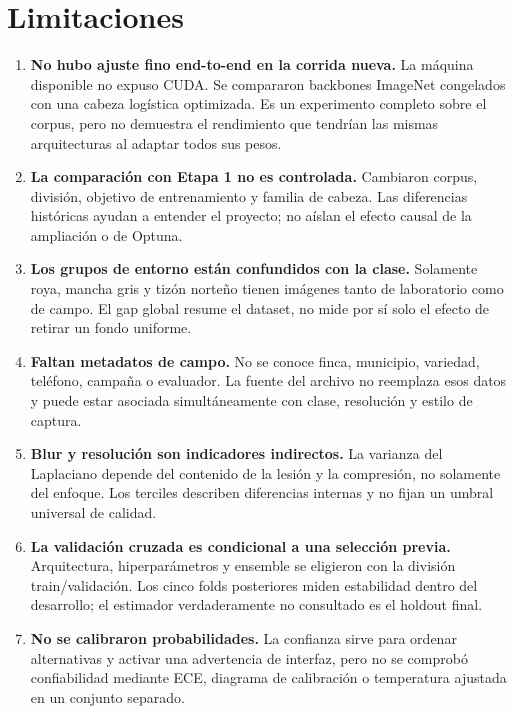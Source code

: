 \section{Limitaciones}

\begin{enumerate}
  \item \textbf{No hubo ajuste fino end-to-end en la corrida nueva.} La máquina
  disponible no expuso CUDA. Se compararon backbones ImageNet congelados con
  una cabeza logística optimizada. Es un experimento completo sobre el corpus,
  pero no demuestra el rendimiento que tendrían las mismas arquitecturas al
  adaptar todos sus pesos.

  \item \textbf{La comparación con Etapa 1 no es controlada.} Cambiaron corpus,
  división, objetivo de entrenamiento y familia de cabeza. Las diferencias
  históricas ayudan a entender el proyecto; no aíslan el efecto causal de la
  ampliación o de Optuna.

  \item \textbf{Los grupos de entorno están confundidos con la clase.}
  Solamente roya, mancha gris y tizón norteño tienen imágenes tanto de
  laboratorio como de campo. El gap global resume el dataset, no mide por sí
  solo el efecto de retirar un fondo uniforme.

  \item \textbf{Faltan metadatos de campo.} No se conoce finca, municipio,
  variedad, teléfono, campaña o evaluador. La fuente del archivo no reemplaza
  esos datos y puede estar asociada simultáneamente con clase, resolución y
  estilo de captura.

  \item \textbf{Blur y resolución son indicadores indirectos.} La varianza del
  Laplaciano depende del contenido de la lesión y la compresión, no solamente
  del enfoque. Los terciles describen diferencias internas y no fijan un
  umbral universal de calidad.

  \item \textbf{La validación cruzada es condicional a una selección previa.}
  Arquitectura, hiperparámetros y ensemble se eligieron con la división
  train/validación. Los cinco folds posteriores miden estabilidad dentro del
  desarrollo; el estimador verdaderamente no consultado es el holdout final.

  \item \textbf{No se calibraron probabilidades.} La confianza sirve para
  ordenar alternativas y activar una advertencia de interfaz, pero no se
  comprobó confiabilidad mediante ECE, diagrama de calibración o temperatura
  ajustada en un conjunto separado.


\end{enumerate}
